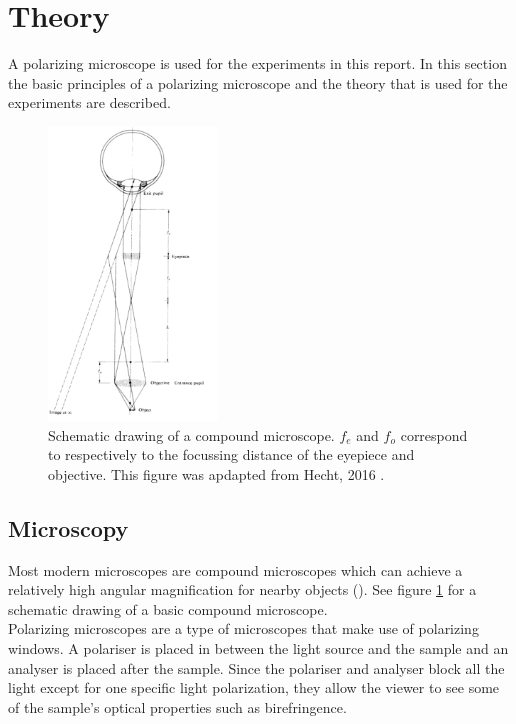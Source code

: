\section{Theory}

A polarizing microscope is used for the experiments in this report. In this section the basic principles of a polarizing microscope and the theory that is used for the experiments are described.

\begin{figure}
	\vspace{-5mm}
	\centering
    \includegraphics[width=0.4\textwidth]{afbeeldingen/compound_microscope.png}
  	\caption{Schematic drawing of a compound microscope. $f_{e}$ and $f_{o}$ correspond to respectively to the focussing distance of the eyepiece and objective. This figure was apdapted from Hecht, 2016 \cite{hecht}.}
  	\label{fig_compound_microscope}
\end{figure}

\subsection{Microscopy}
Most modern microscopes are compound microscopes which can achieve a relatively high angular magnification for nearby objects (\cite{hecht}). See figure \ref{fig_compound_microscope} for a schematic drawing of a basic compound microscope.\\
Polarizing microscopes are a type of microscopes that make use of polarizing windows. A polariser is placed in between the light source and the sample and an analyser is placed after the sample. Since the polariser and analyser block all the light except for one specific light polarization, they allow the viewer to see some of the sample's optical properties such as birefringence. \\

